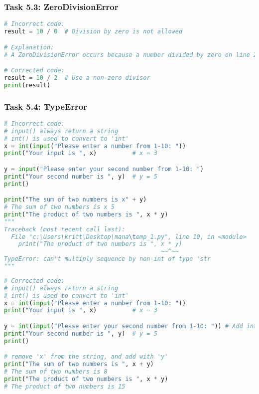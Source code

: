 \documentclass[11pt]{article}
\begin{document}
\subsubsection*{Task 5.3: ZeroDivisionError}
\begin{lstlisting}[language=Python]
# Incorrect code:
result = 10 / 0  # Division by zero is not allowed

# Explanation:
# A ZeroDivisionError occurs because a number divided by zero on line 2.

# Corrected code:
result = 10 / 2  # Use a non-zero divisor
print(result)
\end{lstlisting}

\subsubsection*{Task 5.4: TypeError}
\begin{lstlisting}[language=Python]
# Incorrect code:
# input() always return a string
# int() is used to convert to 'int'
x = int(input("Please enter a number from 1-10: ")) 
print("Your input is ", x)          # x = 3

y = input("Please enter your second number from 1-10: ")
print("Your second number is ", y)  # y = 5
print()

print("The sum of two numbers is x" + y)
# The sum of two numbers is x 5
print("The product of two numbers is ", x * y)
"""
Traceback (most recent call last):
  File "c:\Users\kritt\Desktop\mana\temp_1.py", line 10, in <module>
    print("The product of two numbers is ", x * y)
                                            ~~^~~
TypeError: can't multiply sequence by non-int of type 'str
"""
\end{lstlisting}

\begin{lstlisting}[language=Python]
# Corrected code:
# input() always return a string
# int() is used to convert to 'int'
x = int(input("Please enter a number from 1-10: ")) 
print("Your input is ", x)          # x = 3

y = int(input("Please enter your second number from 1-10: ")) # Add int()
print("Your second number is ", y)  # y = 5
print()

# remove 'x' from the string, and add with 'y'
print("The sum of two numbers is ", x + y) 
# The sum of two numbers is 8
print("The product of two numbers is ", x * y) 
# The product of two numbers is 15
\end{lstlisting}
\end{document}
